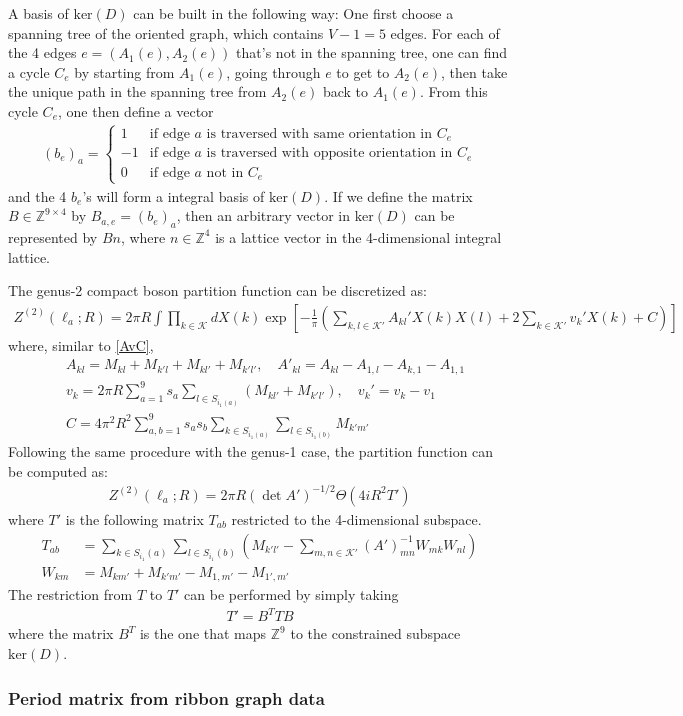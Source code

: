 \documentclass[12pt,letterpaper]{article}
\def\ie{\begin{equation}\begin{aligned}}
\def\fe{\end{aligned}\end{equation}}
\numberwithin{equation}{section}
\begin{document}
A basis of $\text{ker}(D)$ can be built in the following way: One first choose a spanning tree of the oriented graph, which contains $V-1=5$ edges. For each of the 4 edges $e=(A_1(e), A_2(e))$ that's not in the spanning tree, one can find a cycle $C_e$ by starting from $A_1(e)$, going through $e$ to get to $A_2(e)$, then take the unique path in the spanning tree from $A_2(e)$ back to $A_1(e)$. From this cycle $C_e$, one then define a vector
\ie
(b_e)_a=\begin{cases}
 1 & \text{if edge } a \text{ is traversed with same orientation in } C_e\\
 -1 & \text{if edge } a \text{ is traversed with opposite orientation in } C_e\\
 0 & \text{if edge } a \text{ not in } C_e
\end{cases}
\fe
and the 4 $b_e$'s will form a integral basis of $\text{ker}(D)$. If we define the matrix $B\in \mathbb{Z}^{9\times 4}$ by $B_{a,e}=(b_e)_a$, then an arbitrary vector in $\text{ker}(D)$ can be represented by $Bn$, where $n\in \mathbb{Z}^4$ is a lattice vector in the 4-dimensional integral lattice.

The genus-2 compact boson partition function can be discretized as:
\ie
Z^{(2)}(\ell_a;R)=2\pi R \int \prod_{k\in \mathcal{K}} dX(k)\exp\left[-\frac{1}{\pi}\left(\sum_{k,l\in \mathcal{K}'}A_{kl}'X(k)X(l)+2\sum_{k\in\mathcal{K}'}v_k' X(k)+C\right)\right]
\fe
where, similar to \eqref{AvC},
\ie
& A_{kl}=M_{kl}+M_{k'l}+M_{kl'}+M_{k'l'},\quad A'_{kl}=A_{kl}-A_{1,l}-A_{k,1}-A_{1,1}\\
& v_k=2\pi R\sum_{a=1}^9 s_a \sum_{l\in S_{i_1(a)}}(M_{kl'}+M_{k'l'}),\quad v_{k}'=v_{k}-v_1\\
& C=4\pi^2 R^2\sum_{a,b=1}^9 s_a s_b \sum_{k\in S_{i_1(a)}}\sum_{l\in S_{i_1(b)}}M_{k'm'}
\fe
Following the same procedure with the genus-1 case, the partition function can be computed as:
\ie
Z^{(2)}(\ell_a;R)=2\pi R(\det A')^{-1/2}\Theta(4iR^2 T')
\fe
where $T'$ is the following matrix $T_{ab}$ restricted to the 4-dimensional subspace.
\ie
T_{ab}&=\sum_{k\in S_{i_1}(a)}\sum_{l\in S_{i_1}(b)}\left(M_{k'l'}-\sum_{m,n\in \mathcal{K}'}(A')^{-1}_{mn}W_{mk}W_{nl}\right)\\
W_{km}&= M_{km'}+M_{k'm'}-M_{1,m'}-M_{1',m'}
\fe
The restriction from $T$ to $T'$ can be performed by simply taking
\ie
T'=B^T T B
\fe
where the matrix $B^T$ is the one that maps $\mathbb{Z}^9$ to the constrained subspace $\text{ker}(D)$.

\subsubsection*{Period matrix from ribbon graph data}
\end{document}
